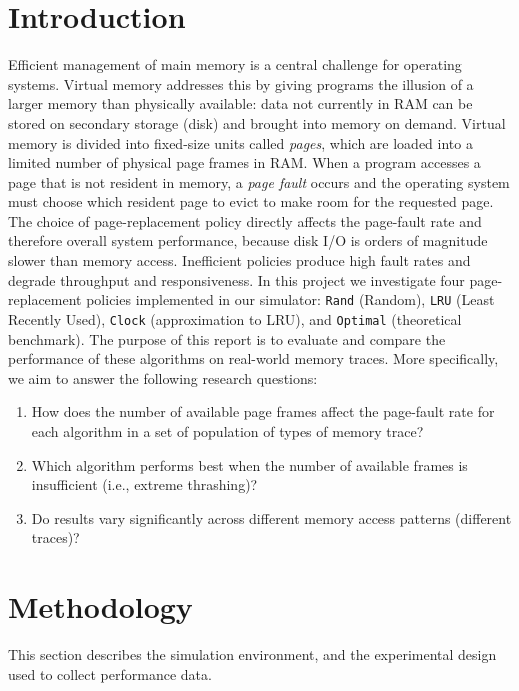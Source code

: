 \documentclass[a4paper, 11pt]{report}
\begin{document}

\newpage
\section*{Introduction}
    \quad\quad Efficient management of main memory is a central challenge for operating systems. Virtual memory addresses this by giving programs the illusion of a larger memory than physically available: data not currently in RAM can be stored on secondary storage (disk) and brought into memory on demand. Virtual memory is divided into fixed-size units called \emph{pages}, which are loaded into a limited number of physical page frames in RAM. When a program accesses a page that is not resident in memory, a \emph{page fault} occurs and the operating system must choose which resident page to evict to make room for the requested page.
    The choice of page-replacement policy directly affects the page-fault rate and therefore overall system performance, because disk I/O is orders of magnitude slower than memory access. Inefficient policies produce high fault rates and degrade throughput and responsiveness. In this project we investigate four page-replacement policies implemented in our simulator: \texttt{Rand} (Random), \texttt{LRU} (Least Recently Used), \texttt{Clock} (approximation to LRU), and \texttt{Optimal} (theoretical benchmark).
    The purpose of this report is to evaluate and compare the performance of these algorithms on real-world memory traces. More specifically, we aim to answer the following research questions:
    \begin{enumerate}
        \item How does the number of available page frames affect the page-fault rate for each algorithm in a set of population of types of memory trace?
        \item Which algorithm performs best when the number of available frames is insufficient (i.e., extreme thrashing)?
        \item Do results vary significantly across different memory access patterns (different traces)?
    \end{enumerate}
\section*{Methodology}
\label{sec:methodology}

This section describes the simulation environment, and the experimental design used to collect performance data.
\end{document}
